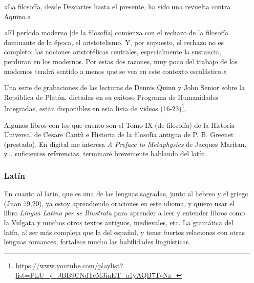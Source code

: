 \documentclass[12pt]{article}
\begin{document}
«La filosofía, desde Descartes hasta el presente, ha sido una revuelta contra
Aquino.»

«El período moderno [de la filosofía] comienza con el rechazo de la filosofía
dominante de la época, el aristotelismo. Y, por supuesto, el rechazo no es
completo: las nociones aristotélicas centrales, especialmente la sustancia,
perduran en los modernos. Por estas dos razones, muy poco del trabajo de los
modernos tendrá sentido a menos que se vea en este contexto escolástico.»

Una serie de grabaciones de las lecturas de Dennis Quinn y John Senior sobre la
República de Platón, dictadas en su exitoso Programa de Humanidades Integradas,
están disponibles en esta lista de videos
(16-23)\footnote{\url{https://www.youtube.com/playlist?list=PLU_y_JBB9CNdTeM3inET_a1yAQB7TvNz_}}.

Algunos libros con los que cuento son el Tomo IX (de filosofía) de la Historia
Universal de Cesare Cantù e Historia de la filosofía antigua de P. B. Greenet
(prestado). En digital me interesa \textit{A Preface to Metaphysics} de Jacques
Maritan,
y... suficientes referencias, terminaré brevemente hablando del
latín.

\subsubsection*{Latín}

En cuanto al latín, que es una de las lenguas sagradas, junto al hebreo y el
griego (Juan 19,20), ya estoy aprendiendo oraciones en este idioma, y quiero
usar el libro \textit{Lingua Latina per se Illustrata} para aprender a leer y
entender
libros como la Vulgata y muchos otros textos antiguos, medievales, etc. La
gramática del latín, al ser más compleja que la del español, y tener fuertes
relaciones con otras lenguas romances, fortalece mucho las habilidades
lingüísticas.
\end{document}
